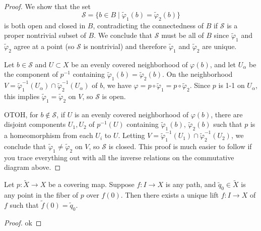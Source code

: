\begin{proof}
    We show that the set \[
        \mathcal{S}=\{b\in B \mid \widetilde \varphi_1 (b)=\widetilde\varphi_2(b)  \} 
    \] is both open and closed in $B$, contradicting the connectedness of $B$ if $\mathcal{S} $ is a proper nontrivial subset of $B$. We conclude that $\mathcal{S} $ must be all of $B$ since $\widetilde \varphi_1 $ and $\widetilde\varphi_2 $ agree at a point (so $\mathcal{S} $ is nontrivial) and therefore $\widetilde\varphi_1 $ and $\widetilde\varphi_2 $ are unique.

    Let $b\in \mathcal{S} $ and $U\subset X$ be an evenly covered neighborhood of $\varphi (b)$, and let $U_{\alpha }$ be the component of $p ^{-1}$ containing $\widetilde \varphi_1(b)=\widetilde \varphi_2(b)  $. On the neighborhood $V=\widetilde \varphi_1^{-1}(U_{\alpha })\cap \widetilde \varphi_2^{-1}(U_{\alpha }) $ of $b$, we have $\varphi =p\circ \widetilde \varphi_1= p \circ \widetilde \varphi_2  $. Since $p$ is 1-1 on $U_{\alpha }$, this implies $\widetilde \varphi_1=\widetilde \varphi_2  $ on $V$, so $\mathcal{S} $ is open. 

    OTOH, for $b\notin \mathcal{S} $, if $U$ is an evenly covered neighborhood of $\varphi (b)$, there are disjoint components $U_1,U_2$ of $p ^{-1}(U)$ containing $\widetilde \varphi_1(b),\,\widetilde \varphi_2(b)  $ such that $p$ is a homeomorphism from each $U_i$ to $U$. Letting $V=\widetilde \varphi_1^{-1}(U_1)\cap \widetilde \varphi_2^{-1}(U_2)  $, we conclude that $\widetilde \varphi_1\neq \widetilde \varphi_2  $ on $V$, so $\mathcal{S} $ is closed. This proof is much easier to follow if you trace everything out with all the inverse relations on the commutative diagram above.
\end{proof}
\begin{prop}
    Let $p \colon \widetilde X \to X$ be a covering map. Suppose $f \colon I \to X$ is any path, and $\widetilde q_0\in \widetilde X$ is any point in the fiber of $p$ over $f(0)$. Then there exists a unique lift $f \colon I \to X$ of $f$ such that $\widetilde f(0)=\widetilde q_0$. 
\end{prop}
\begin{proof}
    ok
\end{proof}

